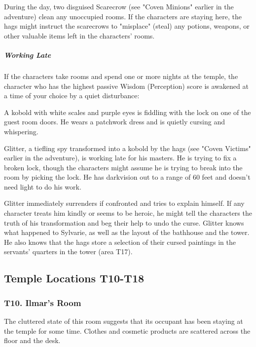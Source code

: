 \documentclass[10pt,a4paper,twoside,bg=print,twocolumn,openany,nodeprecatedcode]{dndbook}
\begin{document}
During the day, two disguised Scarecrow (see "Coven Minions" earlier in the adventure) clean any unoccupied rooms. If the characters are staying here, the hags might instruct the scarecrows to "misplace" (steal) any potions, weapons, or other valuable items left in the characters' rooms.

\subparagraph{Working Late}
If the characters take rooms and spend one or more nights at the temple, the character who has the highest passive Wisdom (Perception) score is awakened at a time of your choice by a quiet disturbance:

\begin{DndReadAloud}{}
A kobold with white scales and purple eyes is fiddling with the lock on one of the guest room doors. He wears a patchwork dress and is quietly cursing and whispering.

\end{DndReadAloud}

Glitter, a tiefling spy transformed into a kobold by the hags (see "Coven Victims" earlier in the adventure), is working late for his masters. He is trying to fix a broken lock, though the characters might assume he is trying to break into the room by picking the lock. He has darkvision out to a range of 60 feet and doesn't need light to do his work.

Glitter immediately surrenders if confronted and tries to explain himself. If any character treats him kindly or seems to be heroic, he might tell the characters the truth of his transformation and beg their help to undo the curse. Glitter knows what happened to Sylvarie, as well as the layout of the bathhouse and the tower. He also knows that the hags store a selection of their cursed paintings in the servants' quarters in the tower (area T17).

\subsection{Temple Locations T10-T18}
\subsubsection{T10. Ilmar's Room}
\begin{DndReadAloud}{}
The cluttered state of this room suggests that its occupant has been staying at the temple for some time. Clothes and cosmetic products are scattered across the floor and the desk.

\end{DndReadAloud}
\end{document}
